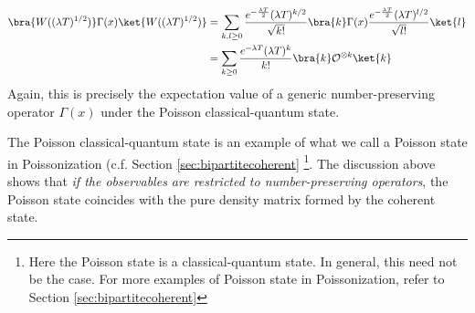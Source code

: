 \documentclass[a4paper,11pt]{article}
\theoremstyle{definition}
\numberwithin{equation}{section}
\begin{document}
\begin{align}
    \begin{split}
        \bra{W((\lambda T)^{1/2})}\Gamma(x)\ket{W((\lambda T)^{1/2})} &= \sum_{k,l\geq 0}\frac{e^{-\frac{\lambda T}{2}}(\lambda T)^{k/2}}{\sqrt{k!}}\bra{k}\Gamma(x)\frac{e^{-\frac{\lambda T}{2}}(\lambda T)^{l/2}}{\sqrt{l!}}\ket{l}
        \\
        &=\sum_{k\geq 0}\frac{e^{-\lambda T}(\lambda T)^k}{k!}\bra{k}\mathcal{O}^{\otimes k}\ket{k}
    \end{split}
\end{align}
Again, this is precisely the expectation value of a generic number-preserving operator $\Gamma(x)$ under the Poisson classical-quantum state. 

The Poisson classical-quantum state is an example of what we call a Poisson state in Poissonization (c.f. Section \ref{sec:bipartitecoherent} \footnote{Here the Poisson state is a classical-quantum state. In general, this need not be the case. For more examples of Poisson state in Poissonization, refer to Section \ref{sec:bipartitecoherent}}.  The discussion above shows that \textit{if the observables are restricted to number-preserving operators}, the Poisson state coincides with the pure density matrix formed by the coherent state. 
\end{document}

